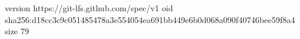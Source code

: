 version https://git-lfs.github.com/spec/v1
oid sha256:d18cc3c9c051485478a3e554054ea691bb449e6b0d068a090f40746bee59f8a4
size 79
